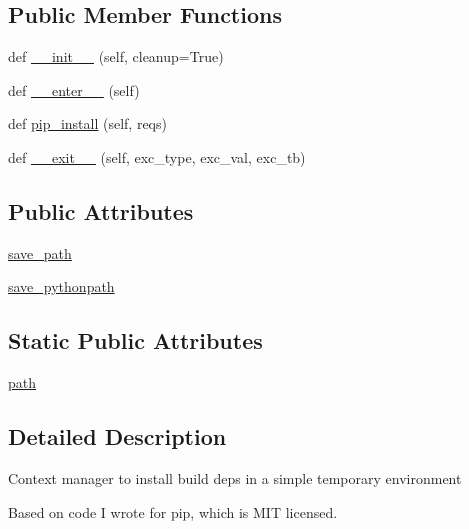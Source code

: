 \subsection*{Public Member Functions}
\begin{DoxyCompactItemize}
\item 
def \hyperlink{classpip_1_1__vendor_1_1pep517_1_1envbuild_1_1BuildEnvironment_aa661a1a38a40ef88c484bc3f1d91e3f0}{\+\_\+\+\_\+init\+\_\+\+\_\+} (self, cleanup=True)
\item 
def \hyperlink{classpip_1_1__vendor_1_1pep517_1_1envbuild_1_1BuildEnvironment_ad7a382c684f855ba1104f67edc67edff}{\+\_\+\+\_\+enter\+\_\+\+\_\+} (self)
\item 
def \hyperlink{classpip_1_1__vendor_1_1pep517_1_1envbuild_1_1BuildEnvironment_ab356ae51c4fcb260a6a369aaa2f1de92}{pip\+\_\+install} (self, reqs)
\item 
def \hyperlink{classpip_1_1__vendor_1_1pep517_1_1envbuild_1_1BuildEnvironment_a8b04843f5b759390800ed914103d0e9e}{\+\_\+\+\_\+exit\+\_\+\+\_\+} (self, exc\+\_\+type, exc\+\_\+val, exc\+\_\+tb)
\end{DoxyCompactItemize}
\subsection*{Public Attributes}
\begin{DoxyCompactItemize}
\item 
\hyperlink{classpip_1_1__vendor_1_1pep517_1_1envbuild_1_1BuildEnvironment_adb17646b1f98daa465eb96f8e1aeef0b}{save\+\_\+path}
\item 
\hyperlink{classpip_1_1__vendor_1_1pep517_1_1envbuild_1_1BuildEnvironment_ab10900c80637c876c1fab2b647fa9439}{save\+\_\+pythonpath}
\end{DoxyCompactItemize}
\subsection*{Static Public Attributes}
\begin{DoxyCompactItemize}
\item 
\hyperlink{classpip_1_1__vendor_1_1pep517_1_1envbuild_1_1BuildEnvironment_ad5430b3a18b487fec5b1ff7ef8ff9ce1}{path}
\end{DoxyCompactItemize}


\subsection{Detailed Description}
\begin{DoxyVerb}Context manager to install build deps in a simple temporary environment

Based on code I wrote for pip, which is MIT licensed.
\end{DoxyVerb}
 

